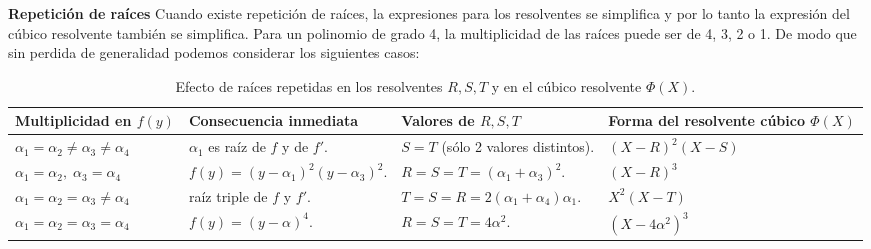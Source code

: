 \begin{solution}

  \textbf{Repetición de raíces}
  Cuando existe repetición de raíces, la expresiones para los resolventes se simplifica y por lo tanto la expresión del cúbico resolvente también se simplifica. Para un polinomio de grado 4, la multiplicidad de las raíces puede ser de 4, 3, 2 o 1. De modo que sin perdida de generalidad podemos considerar los siguientes casos:
  \begin{table}[h]
    \centering
    \renewcommand{\arraystretch}{1.25}
    \begin{tabular}{@{} p{3.2cm} | p{3.1cm} | p{3cm} | p{4.2cm} @{}}
    \toprule
    \textbf{Multiplicidad en $f(y)$} 
    & \textbf{Consecuencia inmediata} 
    & \textbf{Valores de $R,S,T$} 
    & \textbf{Forma del resolvente cúbico $\Phi(X)$} \\ \midrule\midrule
    \(\alpha_{1}=\alpha_{2}\neq\alpha_{3}\neq\alpha_{4}\) 
    & $\alpha_{1}$ es raíz de $f$ y de $f'$. 
    & $S=T$ (sólo 2 valores distintos). 
    & $(X-R)^{2}(X-S)$ \\ \midrule
    \(\alpha_{1}=\alpha_{2},\; \alpha_{3}=\alpha_{4}\) 
    & $f(y)=(y-\alpha_{1})^{2}(y-\alpha_{3})^{2}$. 
    & $R=S=T=(\alpha_{1}+\alpha_{3})^{2}$. 
    & $(X-R)^{3}$ \\ \midrule
    \(\alpha_{1}=\alpha_{2}=\alpha_{3}\neq\alpha_{4}\) 
    & raíz triple de $f$ y $f'$. 
    & $T=S=R=2(\alpha_{1}+\alpha_{4})\alpha_{1}$. 
    & $X^{2}(X-T)$ \\ \midrule
    \(\alpha_{1}=\alpha_{2}=\alpha_{3}=\alpha_{4}\) 
    & $f(y)=(y-\alpha)^{4}$. 
    & $R=S=T=4\alpha^{2}$.
    & $(X-4\alpha^2)^3$
    \\ 
    \bottomrule
    \end{tabular}
    \caption{Efecto de raíces repetidas en los resolventes $R,S,T$ y en el cúbico resolvente $\Phi(X)$.}
    \end{table}
  \end{solution}